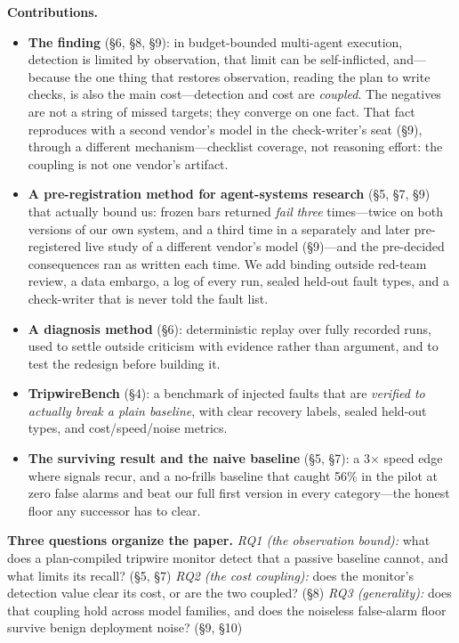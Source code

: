 \documentclass[acmsmall,screen]{acmart}
\begin{document}
\textbf{Contributions.}
\begin{itemize}
  \item \textbf{The finding} (\S6, \S8, \S9): in budget-bounded multi-agent
  execution, detection is limited by observation, that limit can be
  self-inflicted, and---because the one thing that restores observation, reading
  the plan to write checks, is also the main cost---detection and cost are
  \emph{coupled}. The negatives are not a string of missed targets; they converge
  on one fact. That fact reproduces with a second vendor's model in the
  check-writer's seat (\S9), through a different mechanism---checklist coverage,
  not reasoning effort: the coupling is not one vendor's artifact.
  \item \textbf{A pre-registration method for agent-systems research} (\S5,
  \S7, \S9) that actually bound us: frozen bars returned \emph{fail} \emph{three}
  times---twice on both versions of our own system, and a third time in a
  separately and later pre-registered live study of a different vendor's model
  (\S9)---and the pre-decided consequences ran as written each time. We add
  binding outside red-team review, a data embargo, a log of every run, sealed
  held-out fault types, and a check-writer that is never told the fault list.
  \item \textbf{A diagnosis method} (\S6): deterministic replay over fully
  recorded runs, used to settle outside criticism with evidence rather than
  argument, and to test the redesign before building it.
  \item \textbf{TripwireBench} (\S4): a benchmark of injected faults that are
  \emph{verified to actually break a plain baseline}, with clear recovery
  labels, sealed held-out types, and cost/speed/noise metrics.
  \item \textbf{The surviving result and the naive baseline} (\S5, \S7): a
  3$\times$ speed edge where signals recur, and a no-frills baseline that
  caught 56\% in the pilot at zero false alarms and beat our full first version in every
  category---the honest floor any successor has to clear.
\end{itemize}

\textbf{Three questions organize the paper.} \emph{RQ1 (the observation bound):}
what does a plan-compiled tripwire monitor detect that a passive baseline cannot,
and what limits its recall? (\S5, \S7) \emph{RQ2 (the cost coupling):} does the
monitor's detection value clear its cost, or are the two coupled? (\S8)
\emph{RQ3 (generality):} does that coupling hold across model families, and does
the noiseless false-alarm floor survive benign deployment noise? (\S9, \S10)
\end{document}
